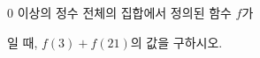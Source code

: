 \hspace*{2mm}\begin{minipage}[t]{\dimexpr\linewidth-2mm\relax}\vspace{0pt}
$0$ 이상의 정수 전체의 집합에서 정의된 함수 $f$가\par\smallskip{}\par\smallskip\noindent 일 때, $f(3)+f(21)$의 값을 구하시오.\end{minipage}
